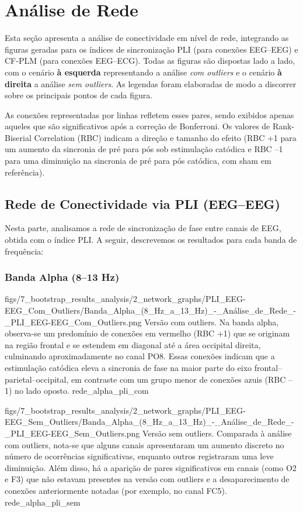 \chapter{Análise de Rede}

Esta seção apresenta a análise de conectividade em nível de rede, integrando as figuras geradas para os índices de sincronização PLI (para conexões EEG–EEG) e CF‐PLM (para conexões EEG–ECG). Todas as figuras são dispostas lado a lado, com o cenário \textbf{à esquerda} representando a análise \emph{com outliers} e o cenário \textbf{à direita} a análise \emph{sem outliers}. As legendas foram elaboradas de modo a discorrer sobre os principais pontos de cada figura. 

As conexões representadas por linhas refletem esses pares, sendo exibidos apenas aqueles que são significativos após a correção de Bonferroni. Os valores de Rank-Biserial Correlation (RBC) indicam a direção e tamanho do efeito (RBC +1 para um aumento da sincronia de pré para pós sob estimulação catódica e RBC –1 para uma diminuição na sincronia de pré para pós catódica, com sham em referência).

\section{Rede de Conectividade via PLI (EEG–EEG)}

Nesta parte, analisamos a rede de sincronização de fase entre canais de EEG, obtida com o índice PLI.  A seguir, descrevemos os resultados para cada banda de frequência:

\subsection{Banda Alpha (8–13 Hz)}
\standardfigure
{figs/7_bootstrap_results_analysis/2_network_graphs/PLI_EEG-EEG_Com_Outliers/Banda_Alpha_(8_Hz_a_13_Hz)_-_Análise_de_Rede_-_PLI_EEG-EEG_Com_Outliers.png}
{Versão com outliers. Na banda alpha, observa-se um predomínio de conexões em vermelho (RBC +1) que se originam na região frontal e se estendem em diagonal até a área occipital direita, culminando aproximadamente no canal PO8. Essas conexões indicam que a estimulação catódica eleva a sincronia de fase na maior parte do eixo frontal–parietal–occipital, em contraste com um grupo menor de conexões azuis (RBC –1) no lado oposto.}
{rede_alpha_pli_com}

\standardfigure
{figs/7_bootstrap_results_analysis/2_network_graphs/PLI_EEG-EEG_Sem_Outliers/Banda_Alpha_(8_Hz_a_13_Hz)_-_Análise_de_Rede_-_PLI_EEG-EEG_Sem_Outliers.png}
{Versão sem outliers. Comparada à análise com outliers, nota-se que alguns canais apresentaram um aumento discreto no número de ocorrências significativas, enquanto outros registraram uma leve diminuição. Além disso, há a aparição de pares significativos em canais (como O2 e F3) que não estavam presentes na versão com outliers e a desaparecimento de conexões anteriormente notadas (por exemplo, no canal FC5).}
{rede_alpha_pli_sem}


